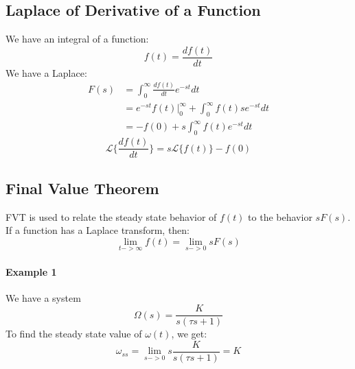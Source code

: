 \subsection{Laplace of Derivative of a Function}
We have an integral of a function:
\[
f(t) = \frac{df(t)}{dt}
\]
We have a Laplace:
\[
\begin{split}
	F(s) &= \int_{0}^{\infty} \frac{df(t)}{dt} e^{-st} dt \\
	&= e^{-st} f(t) |_0^\infty + \int_{0}^{\infty} f(t) se^{-st} dt \\
	&= -f(0) + s \int_{0}^{\infty} f(t) e^{-st} dt
\end{split}
\]
\[
\mathcal{L}\{\frac{df(t)}{dt}\} = s\mathcal{L}\{f(t)\} - f(0)
\]


\subsection{Final Value Theorem}
FVT is used to relate the steady state behavior of \(f(t)\) to the behavior \(sF(s)\). If a function has a Laplace transform, then:
\[
\lim_{t->\infty} f(t) = \lim_{s->0} sF(s)
\]
\paragraph{Example 1} We have a system
\[
\Omega(s) = \frac{K}{s(\tau s + 1)}
\]
To find the steady state value of \(\omega(t)\), we get:
\[
\omega_{ss} = \lim_{s->0} s\frac{K}{s(\tau s + 1)} = K
\]
